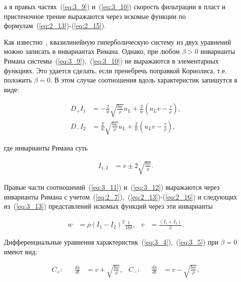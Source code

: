 а в правых частях~(\ref{eq:3_9}) и~(\ref{eq:3_10}) скорость фильтрации в пласт и пристеночное трение выражаются через искомые функции по формулам~(\ref{eq:2_13})-(\ref{eq:2_15}).



Как известно~\cite{rozhd1}, квазилинейную гиперболическую систему из двух уравнений можно записать в инвариантах Римана. Однако, при любом $\beta >0$ инварианты Римана системы~(\ref{eq:3_9}),~(\ref{eq:3_10}) не выражаются в элементарных функциях. Это удается сделать, если пренебречь поправкой Кориолиса, т.е. положить $\beta = 0$. В этом случае соотношения вдоль характеристик запишутся в виде:

\begin{align}

 D_+I_1&= -\frac{2}{w} \sqrt{\frac{bw}{\rho}} u_L + \frac{2}{w} \left(u_L v - \frac{\tau}{\rho}\right), \label{eq:3_11} \\

 D_-I_2&= \frac{2}{w} \sqrt{\frac{bw}{\rho}} u_L + \frac{2}{w} \left(u_L v - \frac{\tau}{\rho}\right), \label{eq:3_12}

\end{align}

где инварианты Римана суть

\begin{align}

 I_{1,2}&= v \pm 2 \sqrt{\frac{bw}{\rho}}. \label{eq:3_13}

\end{align}



Правые части соотношений~(\ref{eq:3_11}) и~(\ref{eq:3_12}) выражаются через инварианты Римана с учетом~(\ref{eq:2_7}),~(\ref{eq:2_13})-(\ref{eq:2_16}) и следующих из~(\ref{eq:3_13}) представлений искомых функций через эти инварианты

\begin{align}

w & = \rho \left(I_1 - I_2\right)^2 \frac{1}{16b}, & v& = \frac{\left(I_1+I_2\right)}{2}. \nonumber

\end{align}



Дифференциальные уравнения характеристик~(\ref{eq:3_4}),~(\ref{eq:3_5}) при $\beta = 0$ имеют вид:

\begin{align}

C_+:& & \frac{dx}{dt} & = v + \sqrt{\frac{bw}{\rho}}, & C_-:& & \frac{dx}{dt} & = v - \sqrt{\frac{bw}{\rho}}, \label{eq:3_14}

\end{align}

